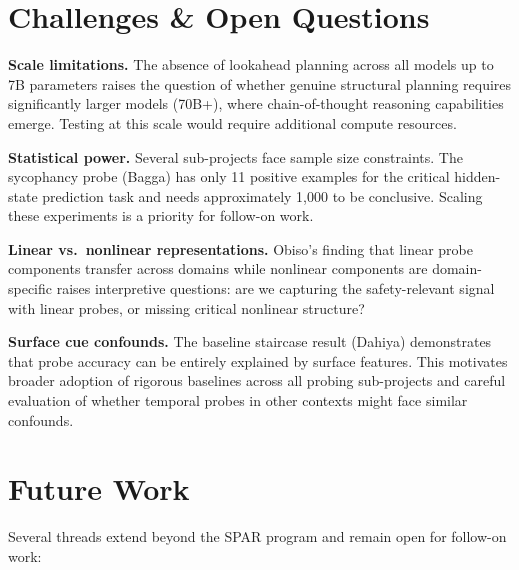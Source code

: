 \documentclass[final]{sparreport}
\begin{document}
\section{Challenges \& Open Questions}

\textbf{Scale limitations.} The absence of lookahead planning across all models up to 7B parameters raises the question of whether genuine structural planning requires significantly larger models (70B+), where chain-of-thought reasoning capabilities emerge. Testing at this scale would require additional compute resources.

\textbf{Statistical power.} Several sub-projects face sample size constraints. The sycophancy probe (Bagga) has only 11 positive examples for the critical hidden-state prediction task and needs approximately 1,000 to be conclusive. Scaling these experiments is a priority for follow-on work.

\textbf{Linear vs.\ nonlinear representations.} Obiso's finding that linear probe components transfer across domains while nonlinear components are domain-specific raises interpretive questions: are we capturing the safety-relevant signal with linear probes, or missing critical nonlinear structure?

\textbf{Surface cue confounds.} The baseline staircase result (Dahiya) demonstrates that probe accuracy can be entirely explained by surface features. This motivates broader adoption of rigorous baselines across all probing sub-projects and careful evaluation of whether temporal probes in other contexts might face similar confounds.

\section{Future Work}

Several threads extend beyond the SPAR program and remain open for follow-on work:
\end{document}
